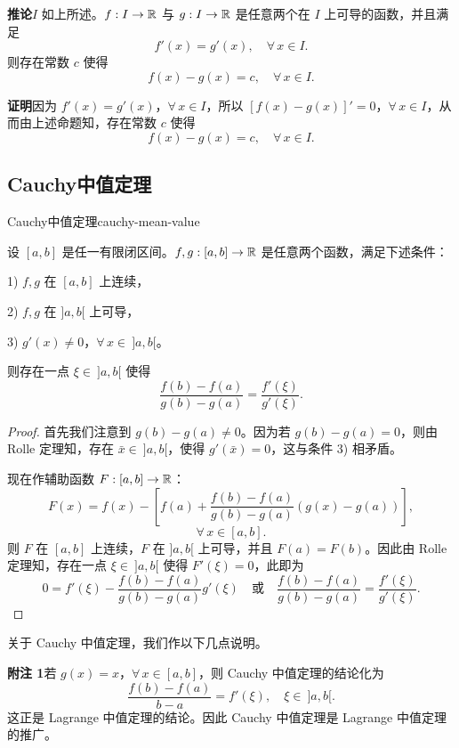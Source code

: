 \textbf{推论}\quad \(I\) 如上所述。\(f:I\to\mathbb{R}\) 与 \(g:I\to\mathbb{R}\) 是任意两个在 \(I\) 上可导的函数，并且满足
\[
f'(x)=g'(x),\quad\forall\,x\in I.
\]
则存在常数 \(c\) 使得
\[
f(x)-g(x)=c,\quad\forall\,x\in I.
\]

\textbf{证明}\quad 因为 \(f'(x)=g'(x)\)，\(\forall\,x\in I\)，所以 \([f(x)-g(x)]'=0\)，\(\forall\,x\in I\)，从而由上述命题知，存在常数 \(c\) 使得
\[
f(x)-g(x)=c,\quad\forall\,x\in I.
\]

\subsection{Cauchy中值定理}
	\label{sec:6-3-3}

\begin{mythm}{Cauchy中值定理}{cauchy-mean-value}

	设 \([a,b]\) 是任一有限闭区间。\(f,g:[a,b]\to\mathbb{R}\) 是任意两个函数，满足下述条件：

	1) \(f,g\) 在 \([a,b]\) 上连续，

	2) \(f,g\) 在 \(]a,b[\) 上可导，

	3) \(g'(x)\neq0\)，\(\forall\,x\in\ ]a,b[\)。

	则存在一点 \(\xi\in\ ]a,b[\) 使得
	\[
	\frac{f(b)-f(a)}{g(b)-g(a)}=\frac{f'(\xi)}{g'(\xi)}.
	\]

\end{mythm}

\begin{proof}

	首先我们注意到 \(g(b)-g(a)\neq0\)。因为若 \(g(b)-g(a)=0\)，则由 Rolle 定理知，存在 \(\bar x\in\ ]a,b[\)，使得 \(g'(\bar x)=0\)，这与条件 3) 相矛盾。

	现在作辅助函数 \(F:[a,b]\to\mathbb{R}\)：
	\[
	F(x)=f(x)-\left[f(a)+\frac{f(b)-f(a)}{g(b)-g(a)}(g(x)-g(a))\right],
	\]
	\[
	\forall\,x\in[a,b].
	\]
	则 \(F\) 在 \([a,b]\) 上连续，\(F\) 在 \(]a,b[\) 上可导，并且 \(F(a)=F(b)\)。因此由 Rolle 定理知，存在一点 \(\xi\in\ ]a,b[\) 使得 \(F'(\xi)=0\)，此即为
	\[
	0=f'(\xi)-\frac{f(b)-f(a)}{g(b)-g(a)}g'(\xi)\quad\text{或}\quad\frac{f(b)-f(a)}{g(b)-g(a)}=\frac{f'(\xi)}{g'(\xi)}.
	\]

\end{proof}

关于 Cauchy 中值定理，我们作以下几点说明。

\textbf{附注 1}\quad 若 \(g(x)=x\)，\(\forall\,x\in[a,b]\)，则 Cauchy 中值定理的结论化为
\[
\frac{f(b)-f(a)}{b-a}=f'(\xi),\quad\xi\in\ ]a,b[.
\]
这正是 Lagrange 中值定理的结论。因此 Cauchy 中值定理是 Lagrange 中值定理的推广。

